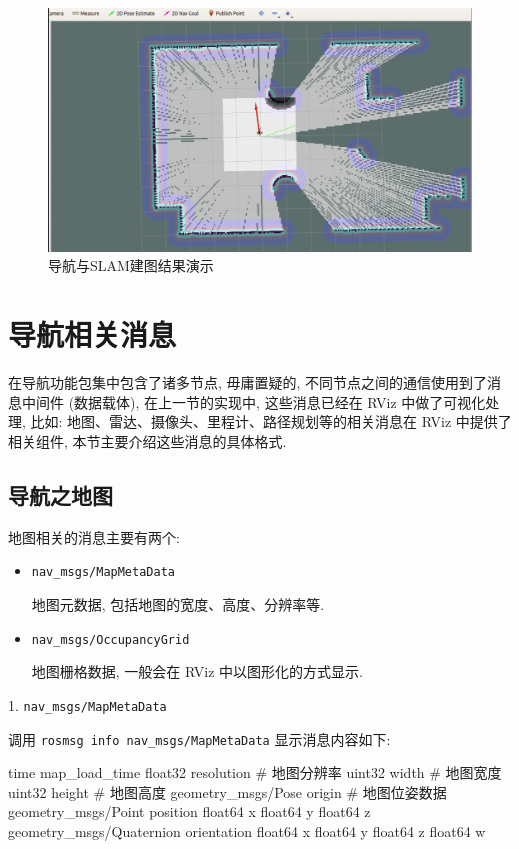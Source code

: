 \documentclass[openany, fontset=windowsold]{ctexbook}
\theoremstyle{kaiti}
\theoremstyle{normal}
\begin{document}
\begin{figure}[!ht]
  \centering
  \includegraphics[width=.9\textwidth]{ros_demo_nav_active_slam.png}
  \caption{导航与SLAM建图结果演示}
  \label{fig:ros_demo_nav_active_slam}
\end{figure}

\section{导航相关消息}

在导航功能包集中包含了诸多节点, 毋庸置疑的, 不同节点之间的通信使用到了消息中间件 (数据载体), 在上一节的实现中, 这些消息已经在 RViz 中做了可视化处理, 比如: 地图、雷达、摄像头、里程计、路径规划等的相关消息在 RViz 中提供了相关组件, 本节主要介绍这些消息的具体格式.

\subsection{导航之地图}

地图相关的消息主要有两个:

\begin{itemize}
  \item \verb|nav_msgs/MapMetaData|

  地图元数据, 包括地图的宽度、高度、分辨率等.

  \item \verb|nav_msgs/OccupancyGrid|

  地图栅格数据, 一般会在 RViz 中以图形化的方式显示.
\end{itemize}

1. \verb|nav_msgs/MapMetaData|

调用 \verb|rosmsg info nav_msgs/MapMetaData| 显示消息内容如下:

\begin{bash}
  time map_load_time
  float32 resolution # 地图分辨率
  uint32 width # 地图宽度
  uint32 height # 地图高度
  geometry_msgs/Pose origin # 地图位姿数据
    geometry_msgs/Point position
      float64 x
      float64 y
      float64 z
    geometry_msgs/Quaternion orientation
      float64 x
      float64 y
      float64 z
      float64 w
\end{bash}
\end{document}
